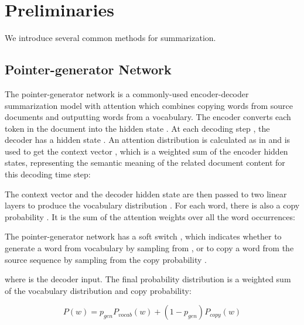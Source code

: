 \documentclass[11pt,a4paper]{article}
\begin{document}
\section{Preliminaries}
We introduce several common methods for summarization. 
\subsection{Pointer-generator Network}







The pointer-generator network \cite{see2017ptr_gen} is a commonly-used encoder-decoder summarization model with attention \cite{bahdanau2014neural} which combines copying words from source documents and outputting words from a vocabulary.  The encoder converts each token  in the document into the hidden state . At each decoding step , the decoder has a hidden state . An attention distribution  is calculated as in \cite{bahdanau2014neural} and is used to get the context vector , which is a weighted sum of the encoder hidden states, representing the semantic meaning of the related document content for this decoding time step: 

\vspace{-4mm}

The context vector  and the decoder hidden state  are then passed to two linear layers to produce the vocabulary distribution . For each word, there is also a copy probability . It is the sum of the attention weights over all the word occurrences:

\vspace{-4mm}

The pointer-generator network has a soft switch , which indicates whether to generate a word from vocabulary by sampling from , or to copy a word from the source sequence by sampling from the copy probability . 

\vspace{-4mm}

where  is the decoder input. The final probability distribution is a weighted sum of the vocabulary distribution and copy probability:

\begin{dmath} 
P(w) = p_{gen}P_{vocab}(w) + (1-p_{gen})P_{copy}(w)
\end{dmath} 
\end{document}
